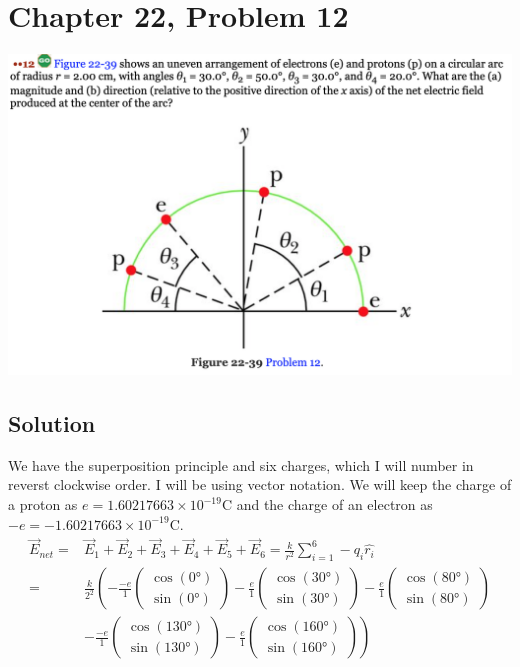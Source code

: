 \documentclass[12pt]{article}
\begin{document}
\section*{Chapter 22, Problem 12}
\includegraphics[width=\textwidth]{picture_6.png}

\subsection*{Solution}
We have the superposition principle and six charges, which I will number in reverst clockwise order. I will be using vector notation. We will keep the charge of a proton as $e = 1.60217663 \times 10^{-19} \unit{\coulomb}$ and the charge of an electron as $-e = -1.60217663 \times 10^{-19} \unit{\coulomb}$.
\begin{align*}
    \vec{E}_{net}   =&  \vec{E}_1 + \vec{E}_2 + \vec{E}_3 + \vec{E}_4 + \vec{E}_5 + \vec{E}_6
        =   \frac{k}{r^2}\sum_{i=1}^{6} - q_i \hat{r_i}\\
        =&  \frac{k}{2^2}\left(-\frac{-e}{1}\begin{pmatrix}\cos(0\unit{\degree})\\ \sin(0\unit{\degree})\end{pmatrix}
            - \frac{e}{1}\begin{pmatrix}\cos(30\unit{\degree})\\ \sin(30\unit{\degree})\end{pmatrix}
            - \frac{e}{1}\begin{pmatrix}\cos(80\unit{\degree})\\ \sin(80\unit{\degree})\end{pmatrix}\right. \\
            & \left. - \frac{-e}{1}\begin{pmatrix}\cos(130\unit{\degree})\\ \sin(130\unit{\degree})\end{pmatrix}
            - \frac{e}{1}\begin{pmatrix}\cos(160\unit{\degree})\\ \sin(160\unit{\degree})\end{pmatrix}\right)
\end{align*}
\end{document}
